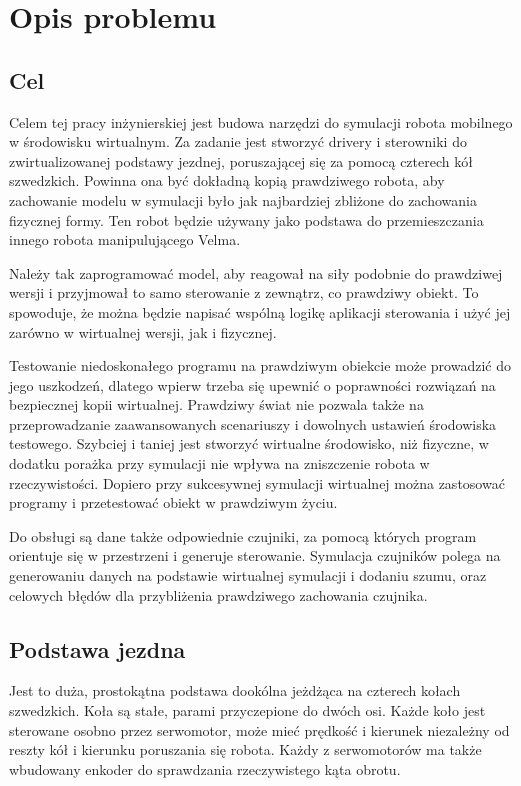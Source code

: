\chapter{Opis problemu}
\section{Cel}
Celem tej pracy inżynierskiej jest budowa narzędzi do symulacji robota mobilnego w środowisku wirtualnym.
Za zadanie jest stworzyć drivery i sterowniki do zwirtualizowanej podstawy jezdnej, poruszającej się za pomocą czterech kół szwedzkich.
Powinna ona być dokładną kopią prawdziwego robota, aby zachowanie modelu w symulacji było jak najbardziej zbliżone do zachowania fizycznej formy.
Ten robot będzie używany jako podstawa do przemieszczania innego robota manipulującego Velma.

Należy tak zaprogramować model, aby reagował na siły podobnie do prawdziwej wersji i przyjmował to samo sterowanie z zewnątrz, co prawdziwy obiekt.
To spowoduje, że można będzie napisać wspólną logikę aplikacji sterowania i użyć jej zarówno w wirtualnej wersji, jak i fizycznej.

Testowanie niedoskonałego programu na prawdziwym obiekcie może prowadzić do jego uszkodzeń, dlatego wpierw trzeba się upewnić o poprawności rozwiązań na bezpiecznej kopii wirtualnej.
Prawdziwy świat nie pozwala także na przeprowadzanie zaawansowanych scenariuszy i dowolnych ustawień środowiska testowego.
Szybciej i taniej jest stworzyć wirtualne środowisko, niż fizyczne, w dodatku porażka przy symulacji nie wpływa na zniszczenie robota w rzeczywistości.
Dopiero przy sukcesywnej symulacji wirtualnej można zastosować programy i przetestować obiekt w prawdziwym życiu.

Do obsługi są dane także odpowiednie czujniki, za pomocą których program orientuje się w przestrzeni i generuje sterowanie.
Symulacja czujników polega na generowaniu danych na podstawie wirtualnej symulacji i dodaniu szumu, oraz celowych błędów dla przybliżenia prawdziwego zachowania czujnika.

\section{Podstawa jezdna}
Jest to duża, prostokątna podstawa dookólna jeżdżąca na czterech kołach szwedzkich.
Koła są stałe, parami przyczepione do dwóch osi.
Każde koło jest sterowane osobno przez serwomotor, może mieć prędkość i kierunek niezależny od reszty kół i kierunku poruszania się robota.
Każdy z serwomotorów ma także wbudowany enkoder do sprawdzania rzeczywistego kąta obrotu.

